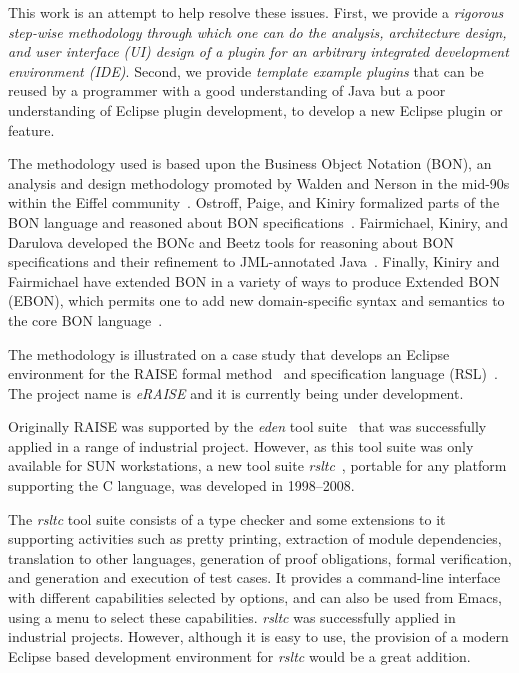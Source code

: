 \documentclass[conference]{IEEEtran}
\begin{document}
This work is an attempt to help resolve these issues.  First, we
provide a \emph{rigorous step-wise methodology through which one can
  do the analysis, architecture design, and user interface (UI) design of a plugin for
  an arbitrary integrated development environment (IDE)}.  Second, we provide \emph{template example
  plugins} that can be reused by a programmer with a good
understanding of Java but a poor understanding of Eclipse plugin
development, to develop a new Eclipse plugin or feature.

The methodology used is based upon the Business Object Notation (BON), an
analysis and design methodology promoted by Walden and Nerson in the
mid-90s within the Eiffel community~\cite{BON}.  Ostroff, Paige, and
Kiniry formalized parts of the BON language and reasoned about BON
specifications~\cite{X,Y,Z}.  Fairmichael, Kiniry, and Darulova
developed the BONc and Beetz tools for reasoning about BON
specifications and their refinement to JML-annotated
Java~\cite{X,Y,Z}.  Finally, Kiniry and Fairmichael have extended BON
in a variety of ways to produce Extended BON (EBON), which permits one
to add new domain-specific syntax and semantics to the core BON
language~\cite{EBON1,EBON2}.

The methodology is illustrated on a case study that develops an
Eclipse environment for the RAISE formal method~\cite{RMG95} and
specification language (RSL)~\cite{RLG92}. The project name is
\emph{eRAISE} and it is currently being under development.

Originally RAISE was supported by the \emph{eden} tool
suite~\cite{edenReferenceManual} that was successfully applied in a
range of industrial project.  However, as this tool suite was only
available for SUN workstations, a new tool suite
\emph{rsltc}~\cite{rsltcUserGuide,RAISETools2003}, portable for any
platform supporting the C language, was developed in 1998--2008. 

The \emph{rsltc} tool suite consists of a type checker and some
extensions to it supporting activities such as pretty printing,
extraction of module dependencies, translation to other languages,
generation of proof obligations, formal verification, and generation
and execution of test cases. It provides a command-line interface with
different capabilities selected by options, and can also be used from
Emacs, using a menu to select these capabilities.  \emph{rsltc} was
successfully applied in industrial projects. However, although it is
easy to use, the provision of a modern Eclipse based development
environment for \emph{rsltc} would be a great addition.
\end{document}

